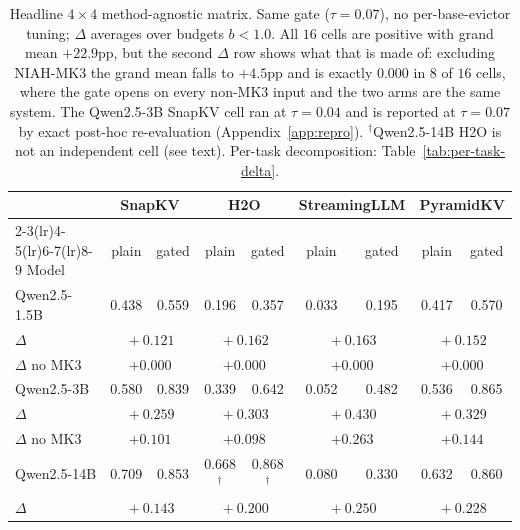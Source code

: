\begin{table}[t]
\centering
\caption{Headline $4 \times 4$ method-agnostic matrix. Same gate
($\tau = 0.07$), no per-base-evictor tuning; $\Delta$ averages over budgets
$b < 1.0$. All $16$ cells are positive with grand mean $+22.9$pp, but the
second $\Delta$ row shows what that is made of: excluding NIAH-MK3 the grand
mean falls to $+4.5$pp and is exactly $0.000$ in $8$ of $16$ cells, where the
gate opens on every non-MK3 input and the two arms are the same system. The
Qwen2.5-3B SnapKV cell ran at $\tau = 0.04$ and is reported at $\tau = 0.07$
by exact post-hoc re-evaluation (Appendix~\ref{app:repro}).
$^\dagger$Qwen2.5-14B H2O is not an independent cell (see text). Per-task
decomposition: Table~\ref{tab:per-task-delta}.}
\label{tab:matrix}
\begin{tabular}{lcccccccc}
\toprule
 & \multicolumn{2}{c}{SnapKV} & \multicolumn{2}{c}{H2O} & \multicolumn{2}{c}{StreamingLLM} & \multicolumn{2}{c}{PyramidKV} \\
\cmidrule(lr){2-3}\cmidrule(lr){4-5}\cmidrule(lr){6-7}\cmidrule(lr){8-9}
Model & plain & gated & plain & gated & plain & gated & plain & gated \\
\midrule
Qwen2.5-1.5B & 0.438 & 0.559 & 0.196 & 0.357 & 0.033 & 0.195 & 0.417 & 0.570 \\
$\Delta$      & \multicolumn{2}{c}{$\!+\!0.121$} & \multicolumn{2}{c}{$\!+\!0.162$} & \multicolumn{2}{c}{$\!+\!0.163$} & \multicolumn{2}{c}{$\!+\!0.152$} \\
{\scriptsize$\Delta$ no MK3} & \multicolumn{2}{c}{\scriptsize$+0.000$} & \multicolumn{2}{c}{\scriptsize$+0.000$} & \multicolumn{2}{c}{\scriptsize$+0.000$} & \multicolumn{2}{c}{\scriptsize$+0.000$} \\
\midrule
Qwen2.5-3B   & 0.580 & 0.839 & 0.339 & 0.642 & 0.052 & 0.482 & 0.536 & 0.865 \\
$\Delta$      & \multicolumn{2}{c}{$\!+\!0.259$} & \multicolumn{2}{c}{$\!+\!0.303$} & \multicolumn{2}{c}{$\!+\!0.430$} & \multicolumn{2}{c}{$\!+\!0.329$} \\
{\scriptsize$\Delta$ no MK3} & \multicolumn{2}{c}{\scriptsize$+0.101$} & \multicolumn{2}{c}{\scriptsize$+0.098$} & \multicolumn{2}{c}{\scriptsize$+0.263$} & \multicolumn{2}{c}{\scriptsize$+0.144$} \\
\midrule
Qwen2.5-14B  & 0.709 & 0.853 & 0.668$^\dagger$ & 0.868$^\dagger$ & 0.080 & 0.330 & 0.632 & 0.860 \\
$\Delta$      & \multicolumn{2}{c}{$\!+\!0.143$} & \multicolumn{2}{c}{$\!+\!0.200$} & \multicolumn{2}{c}{$\!+\!0.250$} & \multicolumn{2}{c}{$\!+\!0.228$} \\

\end{tabular}
\end{table}
